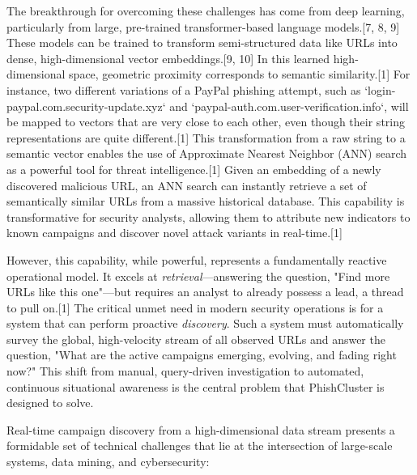 \documentclass[journal,article,submit,pdftex,moreauthors]{Definitions/mdpi}
\begin{document}
The breakthrough for overcoming these challenges has come from deep learning, particularly from large, pre-trained transformer-based language models.[7, 8, 9] These models can be trained to transform semi-structured data like URLs into dense, high-dimensional vector embeddings.[9, 10] In this learned high-dimensional space, geometric proximity corresponds to semantic similarity.[1] For instance, two different variations of a PayPal phishing attempt, such as `login-paypal.com.security-update.xyz` and `paypal-auth.com.user-verification.info`, will be mapped to vectors that are very close to each other, even though their string representations are quite different.[1] This transformation from a raw string to a semantic vector enables the use of Approximate Nearest Neighbor (ANN) search as a powerful tool for threat intelligence.[1] Given an embedding of a newly discovered malicious URL, an ANN search can instantly retrieve a set of semantically similar URLs from a massive historical database. This capability is transformative for security analysts, allowing them to attribute new indicators to known campaigns and discover novel attack variants in real-time.[1]

However, this capability, while powerful, represents a fundamentally reactive operational model. It excels at \textit{retrieval}—answering the question, "Find more URLs like this one"—but requires an analyst to already possess a lead, a thread to pull on.[1] The critical unmet need in modern security operations is for a system that can perform proactive \textit{discovery}. Such a system must automatically survey the global, high-velocity stream of all observed URLs and answer the question, "What are the active campaigns emerging, evolving, and fading right now?" This shift from manual, query-driven investigation to automated, continuous situational awareness is the central problem that PhishCluster is designed to solve.

Real-time campaign discovery from a high-dimensional data stream presents a formidable set of technical challenges that lie at the intersection of large-scale systems, data mining, and cybersecurity:
\end{document}
